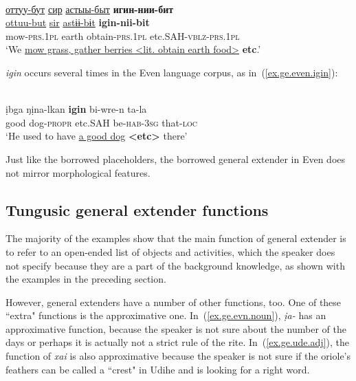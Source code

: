 \documentclass[output=paper,colorlinks,citecolor=brown
\ChapterDOI{10.5281/zenodo.15697577}
]{langscibook}
\begin{document}
 \ea \label{ex.ge.sah.igin}
 \\
\glll \uline{оттуу-бут} \uline{сир} \uline{астыы-быт} \textbf{игин-нии-бит}\\
\uline{ottuu-but} \uline{sir} \uline{astɨɨ-bɨt} \textbf{igin-nii-bit}\\
mow-\textsc{prs}.\textsc{1pl} earth obtain-\textsc{prs}.\textsc{1pl} etc.SAH-\textsc{vblz}-\textsc{prs}.\textsc{1pl}\\
\glt `We \uline{mow grass, gather berries <lit. obtain earth food>} \textbf{etc}.' \\
 \z
{}

\textit{igin} occurs several times in the Even language corpus, as in~(\ref{ex.ge.even.igin}):

 \ea \label{ex.ge.even.igin}
 \\
\gll ịbga ŋịna-lkan \textbf{igin} bi-wre-n ta-la\\
good dog-\textsc{propr} etc.SAH be-\textsc{hab}-\textsc{3sg} that-\textsc{loc}\\
\glt `He used to have \uline{a good dog} \textbf{<etc>} there' \\
 \z
{}

Just like the borrowed placeholders, the borrowed general extender in Even does not mirror morphological features.


\subsection{Tungusic general extender functions}

The majority of the examples show that the main function of general extender is to refer to an open-ended list of objects and activities, which the speaker does not specify because they are a part of the background knowledge, as shown with the examples in the preceding section.

However, general extenders have a number of other functions, too. One of these ``extra" functions is the approximative one. In~(\ref{ex.ge.evn.noun}), \textit{ịa-} has an approximative function, because the speaker is not sure about the number of the days or perhaps it is actually not a strict rule of the rite. In~(\ref{ex.ge.ude.adj}), the function of \textit{xai} is also approximative because the speaker is not sure if the oriole's feathers can be called a ``crest" in Udihe and is looking for a right word.
\end{document}
